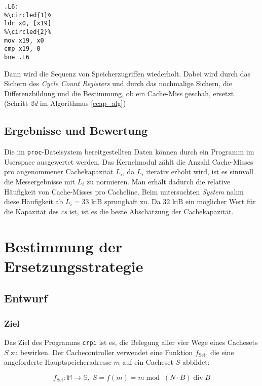 \documentclass[]{scrbook}
\newcommand*\circled[1]{\tikz[scale=0.3, baseline=-3]{
            \node[shape=circle,draw,inner sep=1pt] (char) {\footnotesize{#1}};}}
\begin{document}
\clearpage

\begin{lstlisting}[caption=vom Compiler generierter Assemblercode für Pointer-Chasing, escapechar=\%, label=asmPC]
.L6: 
%\circled{1}% 
ldr	x0, [x19] 
%\circled{2}%
mov	x19, x0 
cmp	x19, 0
bne	.L6
\end{lstlisting}

Dann wird die Sequenz von Speicherzugriffen wiederholt. 
Dabei wird \circled{1} durch das Sichern des \textsl{Cycle Count Registers} und \circled{2} durch das nochmalige Sichern, die Differenzbildung und die Bestimmung, ob ein Cache-Miss geschah, ersetzt (Schritt \textit{2d} im Algorithmus \ref{ccap_alg})

\section{Ergebnisse und Bewertung}



Die im \texttt{proc}-Dateisystem bereitgestellten Daten können durch ein Programm im Userspace ausgewertet werden.
Das Kernelmodul zählt die Anzahl Cache-Misses pro angenommener Cachekapazität $L_i$, da $L_i$ iterativ erhöht wird, ist es sinnvoll die Messergebnisse mit $L_i$ zu normieren.
Man erhält dadurch die relative Häufigkeit von Cache-Misses pro Cacheline.
Beim untersuchten \textsl{System} nahm diese Häufigkeit ab $L_i = 33 \textrm{ kiB}$ sprunghaft zu.
Da $32 \textrm{ kiB}$ ein möglicher Wert für die Kapazität des \textsl{\gls{c}s} ist, ist es die beste Abschätzung der Cachekapazität.

\chapter{Bestimmung der Ersetzungsstrategie} \label{cap4}
\section{Entwurf}
\subsection{Ziel}

Das Ziel des Programms \texttt{crpi} ist es, die Belegung aller vier Wege eines Cachesets $S$ zu bewirken.
Der Cachecontroller verwendet eine Funktion $f_{\textrm{Set}}$, die eine angeforderte Hauptspeicheradresse $m$ auf ein Cacheset $S$ abbildet:

\begin{equation}
f_{\textrm{Set}}: \mathbb{M} \rightarrow \mathbb{S},\;S = f(m) = m \operatorname{mod}\; (N\cdot B) \operatorname{div} B
\end{equation}
\end{document}
